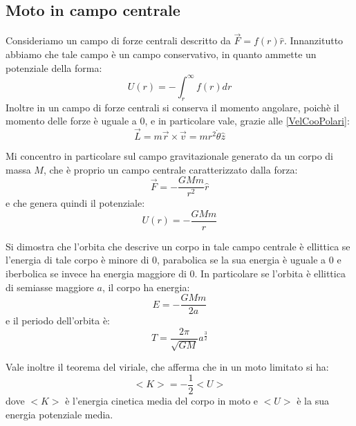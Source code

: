 \documentclass[../main.tex]{subfiles}
\begin{document}
\subsection{Moto in campo centrale}
Consideriamo un campo di forze centrali descritto da $\overrightarrow{F}=f(r)\hat{r}$. 
Innanzitutto abbiamo che tale campo è un campo conservativo, in quanto ammette un potenziale della forma:
\begin{equation*}
	U(r)=-\int_r^\infty{f(r) dr}
\end{equation*}
Inoltre in un campo di forze centrali si conserva il momento angolare, poichè il momento delle forze è uguale a 0,
e in particolare vale, grazie alle \cref{VelCooPolari}:
\begin{equation*}
	\overrightarrow{L}=m\overrightarrow{r}\times\overrightarrow{v}=mr^2\dot{\theta}\hat{z}
\end{equation*}

Mi concentro in particolare sul campo gravitazionale generato da un corpo di massa $M$, che è proprio un campo 
centrale caratterizzato dalla forza:
\begin{equation*}
	\overrightarrow{F}=-\frac{GMm}{r^2}\hat{r}
\end{equation*}
e che genera quindi il potenziale:
\begin{equation*}
	U(r)=-\frac{GMm}{r}
\end{equation*}

Si dimostra che l'orbita che descrive un corpo in tale campo centrale è ellittica se l'energia di tale corpo è
minore di 0, parabolica se la sua energia è uguale a 0 e iberbolica se invece ha energia maggiore di 0.
In particolare se l'orbita è ellittica di semiasse maggiore $a$, il corpo ha energia:
\begin{equation*}
	E=-\frac{GMm}{2a}
\end{equation*}
e il periodo dell'orbita è:
\begin{equation*}
	T=\frac{2\pi}{\sqrt{GM}}a^{\frac{3}{2}}
\end{equation*}

Vale inoltre il teorema del viriale, che afferma che in un moto limitato si ha:
\begin{equation*}
	<K>=-\frac{1}{2}<U>
\end{equation*}
dove $<K>$ è l'energia cinetica media del corpo in moto e $<U>$ è la sua energia potenziale media.
\end{document}
